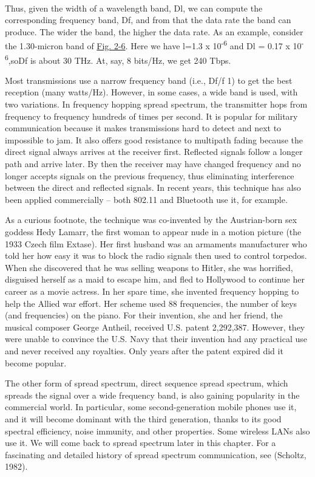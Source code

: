 
~

Thus, given the width of a wavelength band, {D}{l}, we can compute the
corresponding frequency band, {D}{f}, and from that the data rate the
band can produce. The wider the band, the higher the data rate. As an
example, consider the 1.30-micron band of
\protect\hyperlink{0130661023_ch02lev1sec2.htmlux5cux23ch02fig06}{Fig.
2-6}. Here we have {l}=1.3 x 10\textsuperscript{-6} and {D}{l} = 0.17 x
10\textsuperscript{-6},so{D}{f} is about 30 THz. At, say, 8 bits/Hz, we
get 240 Tbps.

Most transmissions use a narrow frequency band (i.e., {D}{f/f}
 1) to get the best reception (many
watts/Hz). However, in some cases, a wide band is used, with two
variations. In {frequency hopping spread spectrum}, the transmitter hops
from frequency to frequency hundreds of times per second. It is popular
for military communication because it makes transmissions hard to detect
and next to impossible to jam. It also offers good resistance to
multipath fading because the direct signal always arrives at the
receiver first. Reflected signals follow a longer path and arrive later.
By then the receiver may have changed frequency and no longer accepts
signals on the previous frequency, thus eliminating interference between
the direct and reflected signals. In recent years, this technique has
also been applied commercially -- both 802.11 and Bluetooth use it, for
example.

As a curious footnote, the technique was co-invented by the
Austrian-born sex goddess Hedy Lamarr, the first woman to appear nude in
a motion picture (the 1933 Czech film {Extase}). Her first husband was
an armaments manufacturer who told her how easy it was to block the
radio signals then used to control torpedos. When she discovered that he
was selling weapons to Hitler, she was horrified, disguised herself as a
maid to escape him, and fled to Hollywood to continue her career as a
movie actress. In her spare time, she invented frequency hopping to help
the Allied war effort. Her scheme used 88 frequencies, the number of
keys (and frequencies) on the piano. For their invention, she and her
friend, the musical composer George Antheil, received U.S. patent
2,292,387. However, they were unable to convince the U.S. Navy that
their invention had any practical use and never received any royalties.
Only years after the patent expired did it become popular.

The other form of spread spectrum, {direct sequence spread spectrum},
which spreads the signal over a wide frequency band, is also gaining
popularity in the commercial world. In particular, some
second-generation mobile phones use it, and it will become dominant with
the third generation, thanks to its good spectral efficiency, noise
immunity, and other properties. Some wireless LANs also use it. We will
come back to spread spectrum later in this chapter. For a fascinating
and detailed history of spread spectrum communication, see (Scholtz,
1982).

